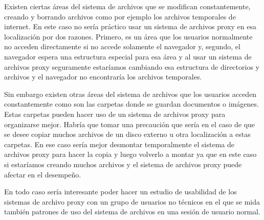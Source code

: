 Existen ciertas áreas del sistema de archivos que se modifican constantemente, creando y borrando archivos como por ejemplo los archivos temporales de internet. En este caso no sería práctico usar un sistema de archivos proxy en esa localización por dos razones. Primero, es un área que los usuarios normalmente no acceden directamente si no accede solamente el navegador y, segundo, el navegador espera una estructura especial para esa área y al usar un sistema de archivos proxy seguramente estaríamos cambiando esa estructura de directorios y archivos y el navegador no encontraría los archivos temporales. 

Sin embargo existen otras áreas del sistema de archivos que los usuarios acceden constantemente como son las carpetas donde se guardan documentos o imágenes. Estas carpetas pueden hacer uso de un sistema de archivos proxy para organizarse mejor. Habría que tomar una precaución que sería en el caso de que se desee copiar muchos archivos de un disco externo u otra localización a estas carpetas. En ese caso sería mejor desmontar temporalmente el sistema de archivos proxy para hacer la copia y luego volverlo a montar ya que en este caso si estaríamos creando muchos archivos y el sistema de archivos proxy puede afectar en el desempeño. 

En todo caso sería interesante poder hacer un estudio de usabilidad de los sistemas de archivo proxy con un grupo de usuarios no técnicos en el que se mida también patrones de uso del sistema de archivos en una sesión de usuario normal.





